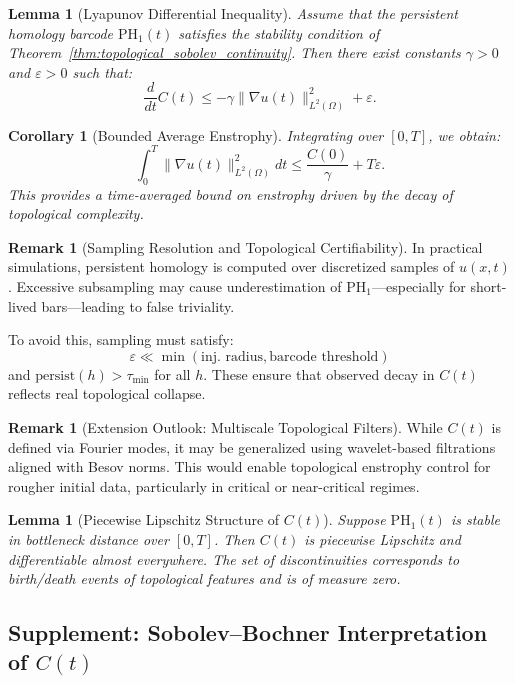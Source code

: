 \documentclass[11pt]{article}
\newtheorem{lemma}[theorem]{Lemma}
\newtheorem{corollary}[theorem]{Corollary}
\theoremstyle{definition}
\newtheorem{remark}[theorem]{Remark}
\begin{document}
\begin{lemma}[Lyapunov Differential Inequality]
Assume that the persistent homology barcode $\mathrm{PH}_1(t)$ satisfies the stability condition of Theorem~\ref{thm:topological_sobolev_continuity}. Then there exist constants $\gamma > 0$ and $\varepsilon > 0$ such that:
\[
\frac{d}{dt} C(t) \leq -\gamma \|\nabla u(t)\|_{L^2(\Omega)}^2 + \varepsilon.
\]
\end{lemma}

\begin{corollary}[Bounded Average Enstrophy]
Integrating over $[0,T]$, we obtain:
\[
\int_0^T \|\nabla u(t)\|_{L^2(\Omega)}^2 dt \leq \frac{C(0)}{\gamma} + T\varepsilon.
\]
This provides a time-averaged bound on enstrophy driven by the decay of topological complexity.
\end{corollary}

\begin{remark}[Sampling Resolution and Topological Certifiability]
In practical simulations, persistent homology is computed over discretized samples of $u(x,t)$. Excessive subsampling may cause underestimation of $\mathrm{PH}_1$—especially for short-lived bars—leading to false triviality.

To avoid this, sampling must satisfy:
\[ \varepsilon \ll \min(\text{inj. radius},\text{barcode threshold}) \]
and $\mathrm{persist}(h) > \tau_\text{min}$ for all $h$. These ensure that observed decay in $C(t)$ reflects real topological collapse.
\end{remark}

\begin{remark}[Extension Outlook: Multiscale Topological Filters]
While $C(t)$ is defined via Fourier modes, it may be generalized using wavelet-based filtrations aligned with Besov norms. This would enable topological enstrophy control for rougher initial data, particularly in critical or near-critical regimes.
\end{remark}

\begin{lemma}[Piecewise Lipschitz Structure of $C(t)$]
Suppose $\mathrm{PH}_1(t)$ is stable in bottleneck distance over $[0,T]$. Then $C(t)$ is piecewise Lipschitz and differentiable almost everywhere. The set of discontinuities corresponds to birth/death events of topological features and is of measure zero.
\end{lemma}

\subsection*{Supplement: Sobolev--Bochner Interpretation of $C(t)$}
\end{document}
